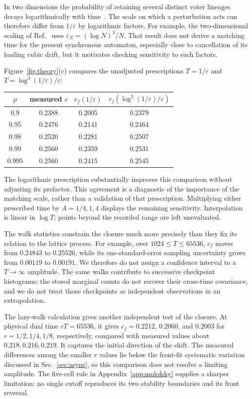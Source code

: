 \documentclass[pre,twocolumn,superscriptaddress,showpacs,floatfix]{revtex4-2}
\begin{document}
In two dimensions the probability of retaining several distinct voter lineages
decays logarithmically with time~\cite{cox2010,cox2025}. The scale on which a
perturbation acts can therefore differ from $1/\varepsilon$ by logarithmic
factors. For example, the two-dimensional scaling of Ref.~\cite{cox2025}
uses $\varepsilon_N=(\log N)^3/N$. That result does not derive a matching
time for the present synchronous automaton, especially close to cancellation
of its leading cubic drift, but it motivates checking sensitivity to such
factors.

Figure~\ref{fig:theory}(c) compares the unadjusted prescriptions
$T=1/\varepsilon$ and $T=\log^3(1/\varepsilon)/\varepsilon$:
\begin{center}
\begin{tabular}{cccc}
$p$ & measured $c$ & $c_f(1/\varepsilon)$ & $c_f(\log^3(1/\varepsilon)/\varepsilon)$\\
\hline
0.9 & 0.2388 & 0.2005 & 0.2379\\
0.95 & 0.2476 & 0.2141 & 0.2464\\
0.98 & 0.2520 & 0.2281 & 0.2507\\
0.99 & 0.2560 & 0.2359 & 0.2531\\
0.995 & 0.2560 & 0.2415 & 0.2545
\end{tabular}
\end{center}
The logarithmic prescription substantially improves this comparison without
adjusting its prefactor. This agreement is a diagnostic of the importance of
the matching scale, rather than a validation of that prescription.
Multiplying either prescribed time by $A=1/4,1,4$ displays the remaining
sensitivity. Interpolation is linear in $\log T$; points beyond the recorded
range are left unevaluated.

The walk statistics constrain the closure much more precisely than they fix
its relation to the lattice process. For example, over $1024\le T\le65536$,
$c_f$ moves from $0.24843$ to $0.25526$, while its one-standard-error sampling
uncertainty grows from $0.00119$ to $0.00191$. We therefore do not assign a
confidence interval to a $T\to\infty$ amplitude. The same walks contribute
to successive checkpoint histograms; the stored marginal counts do not
recover their cross-time covariance, and we do not treat those checkpoints
as independent observations in an extrapolation.

The lazy-walk calculation gives another independent test of the closure.
At physical dual time $rT=65536$, it gives $c_f=0.2212$, $0.2060$, and
$0.2003$ for $r=1/2,1/4,1/8$, respectively, compared with measured values
about $0.218,0.216,0.219$. It captures the initial direction of the shift.
The measured differences among the smaller $r$ values lie below the
front-fit systematic variation discussed in Sec.~\ref{sec:async}, so this
comparison does not resolve a limiting amplitude. The five-cell rule in
Appendix~\ref{app:molofsky} supplies a sharper limitation: no single cutoff
reproduces its two stability boundaries and its front reversal.
\end{document}
